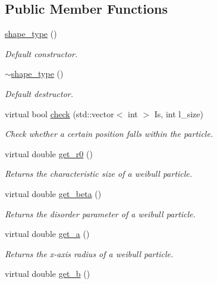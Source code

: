 \subsection*{Public Member Functions}
\begin{DoxyCompactItemize}
\item 
\hyperlink{classparticle_1_1shape__type_aaf2fb3d4c18321d399be05d64336b0c7}{shape\+\_\+type} ()
\begin{DoxyCompactList}\small\item\em Default constructor. \end{DoxyCompactList}\item 
\hyperlink{classparticle_1_1shape__type_a4063d746d095882095a27cdda03a4b7b}{$\sim$shape\+\_\+type} ()
\begin{DoxyCompactList}\small\item\em Default destructor. \end{DoxyCompactList}\item 
virtual bool \hyperlink{classparticle_1_1shape__type_a06456e0960c6dbeba91c312de341ed76}{check} (std\+::vector$<$ int $>$ Is, int l\+\_\+size)
\begin{DoxyCompactList}\small\item\em Check whether a certain position falls within the particle. \end{DoxyCompactList}\item 
virtual double \hyperlink{classparticle_1_1shape__type_aa9f8a91238d955464d9a8f747aea6802}{get\+\_\+r0} ()
\begin{DoxyCompactList}\small\item\em Returns the characteristic size of a weibull particle. \end{DoxyCompactList}\item 
virtual double \hyperlink{classparticle_1_1shape__type_a6d4584a454c2f8b1166dc6f651af0725}{get\+\_\+beta} ()
\begin{DoxyCompactList}\small\item\em Returns the disorder parameter of a weibull particle. \end{DoxyCompactList}\item 
virtual double \hyperlink{classparticle_1_1shape__type_ac1e936b12deb5f0e9cfaa16054ca549a}{get\+\_\+a} ()
\begin{DoxyCompactList}\small\item\em Returns the x-\/axis radius of a weibull particle. \end{DoxyCompactList}\item 
virtual double \hyperlink{classparticle_1_1shape__type_ad943fc36130b1da3e64a2d45f99a75af}{get\+\_\+b} ()

\end{DoxyCompactItemize}
